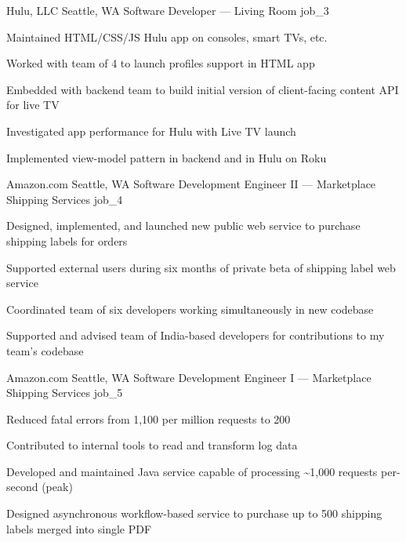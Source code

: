 \documentclass[10pt]{barag_resume}
\begin{document}
    \begin{job}{Hulu, LLC}
        {Seattle, WA}
        {Software Developer --- Living Room}
        {job_3}
            \begin{itemize*}
                \item Maintained HTML/CSS/JS Hulu app on consoles, smart TVs, etc.
                \item Worked with team of 4 to launch profiles support in HTML app
                \item Embedded with backend team to build initial version of client-facing content API for live TV
                \item Investigated app performance for Hulu with Live TV launch
                \item Implemented view-model pattern in backend and in Hulu on Roku
            \end{itemize*}
    \end{job}

    \begin{job}{Amazon.com}
        {Seattle, WA}
        {Software Development Engineer II --- Marketplace Shipping Services}
        {job_4}
            \begin{itemize*}
                \item Designed, implemented, and launched new public web service to purchase shipping labels for orders
                \item Supported external users during six months of private beta of shipping label web service
                \item Coordinated team of six developers working simultaneously in new codebase
                \item Supported and advised team of India-based developers for contributions to my team's codebase
            \end{itemize*}
    \end{job}

    \begin{job}{Amazon.com}
        {Seattle, WA}
        {Software Development Engineer I --- Marketplace Shipping Services}
        {job_5}
            \begin{itemize*}
                \item Reduced fatal errors from 1,100 per million requests to 200
                \item Contributed to internal tools to read and transform log data
                \item Developed and maintained Java service capable of processing \~{}1,000 requests per-second (peak)
                \item Designed asynchronous workflow-based service to purchase up to 500 shipping labels merged into single PDF
            \end{itemize*}
    \end{job}
\end{document}
